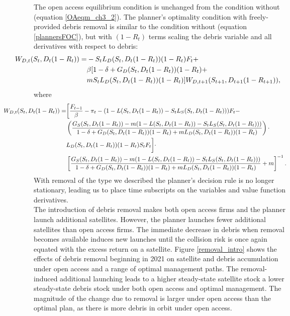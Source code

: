 \documentclass[12pt]{article}
\begin{document}
The open access equilibrium condition is unchanged from the condition without (equation \ref{OAeqm_ch3_2}). The planner's optimality condition with freely-provided debris removal is similar to the condition without (equation \ref{plannersFOC}), but with $(1-R_t)$ terms scaling the debris variable and all derivatives with respect to debris:
\begin{align}
\hspace{-1.25cm}	W_{D,t}(S_t,D_t(1-R_t)) =& - S_t L_D(S_t,D_t(1-R_t))(1-R_t) F_t + \nonumber \\
& \beta [1 - \delta + G_D(S_t,D_t(1-R_t))(1-R_t) + \nonumber \\
& m S_tL_D(S_t,D_t(1-R_t))(1-R_t)] W_{D,t+1}(S_{t+1},D_{t+1}(1-R_{t+1})),
\end{align}
where
\begin{align}
\hspace{-1.75cm}	W_{D,t}(S_t,D_t(1-R_t)) =& \bigg[ \frac{F_{t-1}}{\beta} - \pi_t - (1 - L(S_t,D_t(1-R_t)) - S_t L_S(S_t,D_t(1-R_t)))F_t - \nonumber \\
& \left( \frac{G_S(S_t,D_t(1-R_t)) - m(1 - L(S_t,D_t(1-R_t)) - S_tL_S(S_t,D_t(1-R_t)))}{1 - \delta + G_D(S_t,D_t(1-R_t))(1-R_t) + m L_D(S_t,D_t(1-R_t))(1-R_t)} \right) \cdot \nonumber \\
& L_D(S_t,D_t(1-R_t))(1-R_t) S_t F_t  \bigg] \cdot \nonumber \\
& \left[ \frac{G_S(S_t,D_t(1-R_t)) - m(1 - L(S_t,D_t(1-R_t)) - S_tL_S(S_t,D_t(1-R_t)))}{1 - \delta + G_D(S_t,D_t(1-R_t))(1-R_t) + m L_D(S_t,D_t(1-R_t))(1-R_t)} + m \right]^{-1}.
\end{align}
With removal of the type we described the planner's decision rule is no longer stationary, leading us to place time subscripts on the variables and value function derivatives. \\

The introduction of debris removal makes both open access firms and the planner launch additional satellites. However, the planner launches fewer additional satellites than open access firms. The immediate decrease in debris when removal becomes available induces new launches until the collision risk is once again equated with the excess return on a satellite. Figure \ref{removal_intro} shows the effects of debris removal beginning in 2021 on satellite and debris accumulation under open access and a range of optimal management paths. The removal-induced additional launching leads to a higher steady-state satellite stock a lower steady-state debris stock under both open access and optimal management. The magnitude of the change due to removal is larger under open access than the optimal plan, as there is more debris in orbit under open access.
\end{document}
